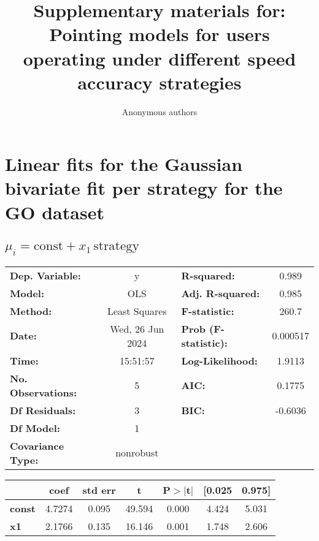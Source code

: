\documentclass{article}
\title{Supplementary materials for: Pointing models for users operating under
different speed accuracy strategies }
\author{Anonymous authors}
\begin{document}
\maketitle

\section{Linear fits for the Gaussian bivariate fit per strategy for the GO dataset}
\subsection{$\mu_i = \text{const} + x_1\,\text{strategy}$}
\begin{center}
    \begin{tabular}{lclc}
        \toprule
        \textbf{Dep. Variable:}    & y                & \textbf{  R-squared:         } & 0.989    \\
        \textbf{Model:}            & OLS              & \textbf{  Adj. R-squared:    } & 0.985    \\
        \textbf{Method:}           & Least Squares    & \textbf{  F-statistic:       } & 260.7    \\
        \textbf{Date:}             & Wed, 26 Jun 2024 & \textbf{  Prob (F-statistic):} & 0.000517 \\
        \textbf{Time:}             & 15:51:57         & \textbf{  Log-Likelihood:    } & 1.9113   \\
        \textbf{No. Observations:} & 5                & \textbf{  AIC:               } & 0.1775   \\
        \textbf{Df Residuals:}     & 3                & \textbf{  BIC:               } & -0.6036  \\
        \textbf{Df Model:}         & 1                & \textbf{                     } &          \\
        \textbf{Covariance Type:}  & nonrobust        & \textbf{                     } &          \\
        \bottomrule
    \end{tabular}
    \begin{tabular}{lcccccc}
                       & \textbf{coef} & \textbf{std err} & \textbf{t} & \textbf{P$> |$t$|$} & \textbf{[0.025} & \textbf{0.975]} \\
        \midrule
        \textbf{const} & 4.7274        & 0.095            & 49.594     & 0.000               & 4.424           & 5.031           \\
        \textbf{x1}    & 2.1766        & 0.135            & 16.146     & 0.001               & 1.748           & 2.606           \\

\end{tabular}
\end{center}
\end{document}
